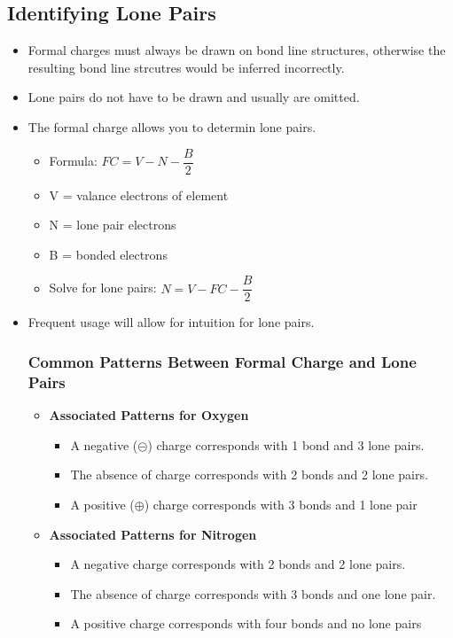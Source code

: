 \documentclass[12pt,a4paper]{article}
\begin{document}
\subsection{Identifying Lone Pairs}
\begin{itemize}
    \item Formal charges must always be drawn on bond line structures, otherwise the resulting bond line strcutres would be inferred incorrectly.
    \item Lone pairs do not have to be drawn and usually are omitted.
    \item The formal charge allows you to determin lone pairs.
        \begin{itemize}
            \item Formula: \(FC = V - N - \dfrac{B}{2}\)
            \item V = valance electrons of element
            \item N = lone pair electrons
            \item B = bonded electrons
            \item Solve for lone pairs: {\color{o-Sun}\(N = V - FC - \dfrac{B}{2}\)}
        \end{itemize}
    \item Frequent usage will allow for intuition for lone pairs.
    \subsubsection{Common Patterns Between Formal Charge and Lone Pairs}
    \begin{itemize}
        \item \textbf{Associated Patterns for Oxygen}
            \begin{itemize}
                \item A {\color{neg}negative ($\circleddash$)} charge corresponds with {\color{o-Sun}1 bond} and {\color{o-Sun}3 lone pairs}.
                \item The {\color{G-Moon}absence} of charge corresponds with {\color{o-Sun}2 bonds} and {\color{o-Sun}2 lone pairs}.
                \item A {\color{pos}positive ($\oplus$)} charge corresponds with {\color{o-Sun}3 bonds} and {\color{o-Sun}1 lone pair} 
            \end{itemize}
        \item \textbf{Associated Patterns for Nitrogen}
            \begin{itemize}
                \item A {\color{neg}negative} charge corresponds with {\color{o-Sun}2 bonds} and {\color{o-Sun}2 lone pairs}.
                \item The {\color{G-Moon}absence} of charge corresponds with {\color{o-Sun}3 bonds} and {\color{o-Sun}one lone pair}.
                \item A {\color{pos}positive} charge corresponds with {\color{o-Sun}four bonds} and {\color{o-Sun}no lone pairs} 
            \end{itemize}
    \end{itemize}
\end{itemize}
\end{document}

